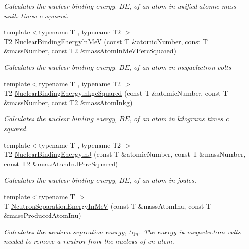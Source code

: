 \begin{DoxyCompactItemize}
\begin{DoxyCompactList}\small\item\em Calculates the nuclear binding energy, $BE$, of an atom in unified atomic mass units times c squared. \end{DoxyCompactList}\item 
{\footnotesize template$<$typename T , typename T2 $>$ }\\T2 \mbox{\hyperlink{group___e_g_x_phys-_nuclear_binding_energy_ga25f5d2d32fad7e28e278cf8b5ea8ffa8}{Nuclear\+Binding\+Energy\+In\+MeV}} (const T \&atomic\+Number, const T \&mass\+Number, const T2 \&mass\+Atom\+In\+Me\+V\+Perc\+Squared)
\begin{DoxyCompactList}\small\item\em Calculates the nuclear binding energy, $BE$, of an atom in megaelectron volts. \end{DoxyCompactList}\item 
{\footnotesize template$<$typename T , typename T2 $>$ }\\T2 \mbox{\hyperlink{group___e_g_x_phys-_nuclear_binding_energy_gaf229d8c0d2aa30ff95aa20e5213df3bd}{Nuclear\+Binding\+Energy\+Inkgc\+Squared}} (const T \&atomic\+Number, const T \&mass\+Number, const T2 \&mass\+Atom\+Inkg)
\begin{DoxyCompactList}\small\item\em Calculates the nuclear binding energy, $BE$, of an atom in kilograms times c squared. \end{DoxyCompactList}\item 
{\footnotesize template$<$typename T , typename T2 $>$ }\\T2 \mbox{\hyperlink{group___e_g_x_phys-_nuclear_binding_energy_gae48a95188d9b71b36d02babf227b9449}{Nuclear\+Binding\+Energy\+InJ}} (const T \&atomic\+Number, const T \&mass\+Number, const T2 \&mass\+Atom\+In\+J\+Perc\+Squared)
\begin{DoxyCompactList}\small\item\em Calculates the nuclear binding energy, $BE$, of an atom in joules. \end{DoxyCompactList}\item 
{\footnotesize template$<$typename T $>$ }\\T \mbox{\hyperlink{group___e_g_x_phys-_nuclear_separation_energy_ga66133edb5809c81dd9fd60e09ebbef79}{Neutron\+Separation\+Energy\+In\+MeV}} (const T \&mass\+Atom\+Inu, const T \&mass\+Produced\+Atom\+Inu)
\begin{DoxyCompactList}\small\item\em Calculates the neutron separation energy, $S_{1n}$. The energy in megaelectron volts needed to remove a neutron from the nucleus of an atom. \end{DoxyCompactList}\item 

\end{DoxyCompactItemize}
